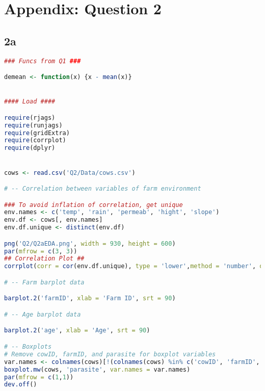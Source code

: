 \documentclass[11pt]{article}
\begin{document}
\newpage
\section{Appendix: Question 2} \label{appA2}

\subsection{2a} \label{AppA2a}
\begin{lstlisting}[language=R]
### Funcs from Q1 ###

demean <- function(x) {x - mean(x)}


#### Load ####

require(rjags)
require(runjags)
require(gridExtra)
require(corrplot)
require(dplyr)


cows <- read.csv('Q2/Data/cows.csv')

# -- Correlation between variables of farm environment

### To avoid inflation of correlation, get unique
env.names <- c('temp', 'rain', 'permeab', 'hight', 'slope')
env.df <- cows[, env.names]
env.df.unique <- distinct(env.df)

png('Q2/Q2aEDA.png', width = 930, height = 600)
par(mfrow = c(3, 3))
## Correlation Plot ##
corrplot(corr = cor(env.df.unique), type = 'lower',method = 'number', order = 'hclust')

# -- Farm barplot data

barplot.2('farmID', xlab = 'Farm ID', srt = 90)

# -- Age barplot data

barplot.2('age', xlab = 'Age', srt = 90)

# -- Boxplots
# Remove cowID, farmID, and parasite for boxplot variables
var.names <- colnames(cows)[!(colnames(cows) %in% c('cowID', 'farmID', 'parasite'))]
boxplot.mw(cows, 'parasite', var.names = var.names)
par(mfrow = c(1,1))
dev.off()

\end{lstlisting}

\newpage
\end{document}
